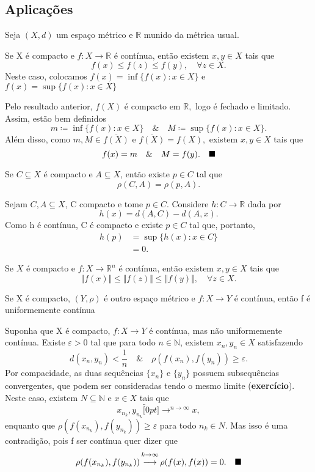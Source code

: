 \documentclass[metric_notes.tex]{subfiles}
\begin{document}
\subsection{Aplicações}
Seja \((X, d)\) um espaço métrico e \(\mathbb{R}\) munido da métrica usual.
\begin{theorem*}
	Se X é compacto e \(f:X\rightarrow \mathbb{R}\) é contínua, então existem \(x, y\in X\) tais que
	\[
		f(x)\leq f(z)\leq f(y),\quad \forall z\in X.
	\]
	Neste caso, colocamos \(f(x)=\inf\{f(x):x\in X\}\) e \(f(x) = \sup\{f(x):x\in X\}\)
\end{theorem*}
\begin{proof*}
	Pelo resultado anterior, \(f(X)\) é compacto em \(\mathbb{R},\) logo é fechado e limitado. Assim, estão bem definidos
	\[
		m\coloneqq \inf\{f(x):x\in X\}\quad\&\quad M\coloneqq \sup\{f(x):x\in X\}.
	\]
	Além disso, como \(m, M\in \overline{f(X)}\) e \(\overline{f(X)} = f(X),\) existem \(x, y\in X\) tais que
	\[
		f(x) = m\quad\&\quad M = f(y).\quad \text{$\blacksquare$}
	\]
\end{proof*}
\begin{crl*}
	Se \(C\subseteq X\) é compacto e \(A\subseteq X\), então existe \(p\in C\) tal que
	\[
		\rho (C, A) = \rho (p, A).
	\]
\end{crl*}
\begin{proof*}
	Sejam \(C, A\subseteq X\), C compacto e tome \(p\in C\). Considere \(h:C\rightarrow \mathbb{R}\) dada por
	\[
		h(x) = d(A, C) - d(A, x).
	\]
	Como h é contínua, C é compacto e existe \(p\in C\) tal que, portanto,
	\begin{align*}
		h(p) & = \sup\{h(x):x\in C\} \\
		     & = 0.
	\end{align*}
\end{proof*}
\begin{crl*}
	Se \(X\) é compacto e \(f:X\rightarrow \mathbb{R}^{n}\) é contínua, então existem \(x, y\in X\) tais que
	\[
		\Vert f(x) \Vert\leq \Vert f(z) \Vert\leq \Vert f(y) \Vert,\quad \forall z\in X.
	\]
\end{crl*}
\begin{prop*}
	Se X é compacto, \((Y, \rho )\) é outro espaço métrico e \(f:X\rightarrow Y \) é contínua, então f é uniformemente contínua
\end{prop*}
\begin{proof*}
	Suponha que X é compacto, \(f:X\rightarrow Y\) é contínua, mas não uniformemente contínua. Existe \(\varepsilon >0\) tal que
	para todo \(n\in \mathbb{N}\), existem \(x_{n}, y_{n}\in X\) satisfazendo
	\[
		d(x_{n},y_{n}) < \frac{1}{n}\quad\&\quad \rho (f(x_{n}), f(y_{n}))\geq \varepsilon .
	\]
	Por compacidade, as duas sequências \(\{x_{n}\}\) e \(\{y_{n}\}\) possuem subsequências convergentes, que podem
	ser consideradas tendo o mesmo limite (\textbf{exercício}). Neste caso, existem \(N\subseteq \mathbb{N}\) e \(x\in X\) tais que
	\[
		x_{n_{k}}, y_{n_{k}}\overbracket[0pt]{\longrightarrow}^{n\to \infty}x,
	\]
	enquanto que \(\rho (f(x_{n_{k}}), f(y_{n_{k}}))\geq \varepsilon \) para todo \(n_{k}\in N\).
	Mas isso é uma contradição, pois f ser contínua quer dizer que
	\[
		\rho (f(x_{n_{k}}), f(y_{n_{k}}))\overbracket[0pt]{\longrightarrow}^{k\to \infty}\rho(f(x), f(x)) = 0.\quad \text{\qedsymbol}
	\]
\end{proof*}
\end{document}
